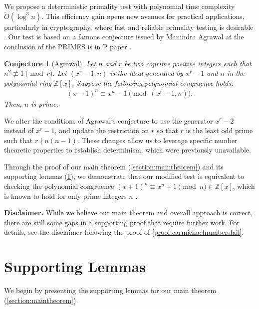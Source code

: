 \documentclass{article}
\theoremstyle{plain}
\newtheorem*{conjecture*}{Conjecture}
\theoremstyle{definition}
\newcommand{\Z}{\mathbb{Z}}
\begin{document}
We propose a deterministic primality test with polynomial time complexity $\tilde{O}(\log^3 n)$. This efficiency gain opens new avenues for practical applications, particularly in cryptography, where fast and reliable primality testing is desirable \cite{lenstra1987elliptic}. Our test is based on a famous conjecture issued by Manindra Agrawal at the conclusion of the PRIMES is in P paper \cite{aks2002}.
\begin{conjecture*}[Agrawal]
Let $n$ and $r$ be two coprime positive integers such that $n^2 \not\equiv 1 \pmod{r}$. Let $(x^r-1,n)$ is the ideal generated by $x^r-1$ and $n$ in the polynomial ring $\Z[x]$. Suppose the following polynomial congruence holds:
\begin{align*}
    (x - 1)^n \equiv x^n - 1 \pmod{(x^r - 1,n)} .
\end{align*}
Then, $n$ is prime.
\end{conjecture*}
We alter the conditions of Agrawal's conjecture to use the generator $x^r-2$ instead of $x^r-1$, and update the restriction on $r$ so that $r$ is the least odd prime such that $r \nmid n (n-1)$. These changes allow us to leverage specific number theoretic properties to establish determinism, which were previously unavailable.

Through the proof of our main theorem (\cref{section:maintheorem}) and its supporting lemmas (\cref{section:supportinglemmas}), we demonstrate that our modified test is equivalent to checking the polynomial congruence $(x+1)^n \equiv x^n+1 \pmod{n} \in \mathbb{Z}[x]$, which is known to hold for only prime integers $n$ \cite{granville2004primes}.

\textbf{Disclaimer.} While we believe our main theorem and overall approach is correct, there are still some gaps in a supporting proof that require further work. For details, see the disclaimer following the proof of \cref{proof:carmichaelnumbersfail}.

\section{Supporting Lemmas} \label{section:supportinglemmas}
We begin by presenting the supporting lemmas for our main theorem (\cref{section:maintheorem}).
\end{document}
